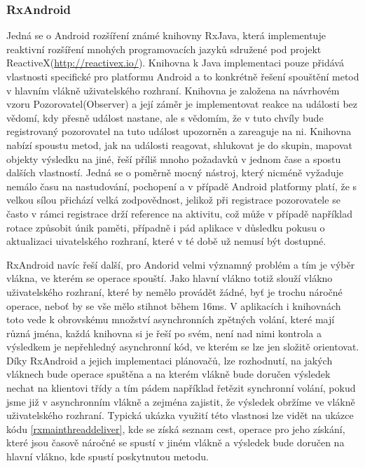 \documentclass{article}
\begin{document}
\subsubsection{RxAndroid}
Jedná se o Android rozšíření známé knihovny RxJava, která implementuje reaktivní rozšíření
mnohých programovacích jazyků sdružené pod projekt ReactiveX(\url{http://reactivex.io/}).
Knihovna k Java implementaci pouze přidává vlastnosti specifické pro platformu Android a to konkrétně
řešení spouštění metod v hlavním vlákně uživatelského rozhraní. Knihovna je založena na návrhovém
vzoru Pozorovatel(Observer) a její záměr je implementovat reakce na události bez vědomí, kdy přesně
událost nastane, ale s vědomím, že v tuto chvíly bude registrovaný pozorovatel na tuto událost
upozorněn a zareaguje na ni. Knihovna nabízí spoustu metod, jak na události reagovat, shlukovat je do
skupin, mapovat objekty výsledku na jiné, řeší příliš mnoho požadavků v jednom čase a spostu dalších vlastností.
Jedná se o poměrně mocný nástroj, který nicméně vyžaduje nemálo času na nastudování, pochopení a v případě
Android platformy platí, že s velkou sílou přichází velká zodpovědnost, jelikož při registrace pozorovatele
se často v rámci registrace drží reference na aktivitu, což může v případě například rotace způsobit únik paměti,
případně i pád aplikace v důsledku pokusu o aktualizaci uivatelského rozhraní, které v té době už nemusí být dostupné.

RxAndroid navíc řeší další, pro Andorid velmi významný problém a tím je výběr vlákna, ve kterém se
operace spouští. Jako hlavní vlákno totiž slouží vlákno uživatelského rozhraní, které by
nemělo provádět žádné, byť je trochu náročné operace, neboť by se vše mělo stihnot během 16ms.\cite{perf}
V aplikacích i knihovnách toto vede k obrovskému množství asynchronních zpětných volání, které mají různá jména,
každá knihovna si je řeší po svém, není nad nimi kontrola a výsledkem je nepřehledný asynchronní kód,
ve kterém se lze jen složitě orientovat. Díky RxAndroid a jejich implementaci plánovačů, lze rozhodnutí,
na jakých vláknech bude operace spuštěna a na kterém vlákně bude doručen výsledek nechat na klientovi třídy
a tím pádem například řetězit synchronní volání, pokud jsme již v asynchronním vlákně a zejména zajistit,
že výsledek obržíme ve vlákně uživatelského rozhraní. Typická ukázka využití této vlastnosi
lze vidět na ukázce kódu \ref{rxmainthreaddeliver}, kde se získá seznam cest, operace pro jeho získání,
které jsou časově náročné se spustí v jiném vlákně a výsledek bude doručen na hlavní vlákno,
kde spustí poskytnutou metodu.
\end{document}
